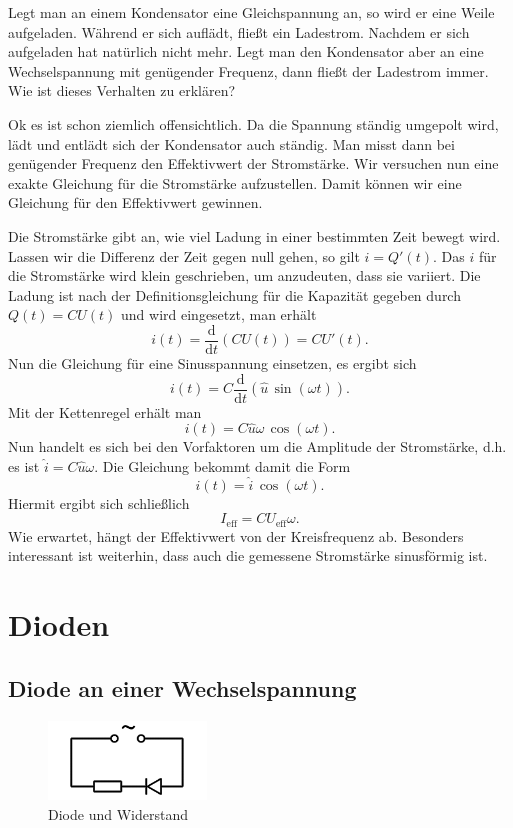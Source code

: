 \documentclass[a4paper,10pt,fleqn,twocolumn,twoside,dvipdfmx]{scrartcl}
\numberwithin{equation}{section}
\begin{document}
Legt man an einem Kondensator eine Gleichspannung an, so wird er eine
Weile aufgeladen. Während er sich auflädt, fließt ein Ladestrom.
Nachdem er sich aufgeladen hat natürlich nicht mehr. Legt man den
Kondensator aber an eine Wechselspannung mit genügender Frequenz,
dann fließt der Ladestrom immer. Wie ist dieses Verhalten zu
erklären?

Ok es ist schon ziemlich offensichtlich. Da die Spannung ständig
umgepolt wird, lädt und entlädt sich der Kondensator auch ständig.
Man misst dann bei genügender Frequenz den Effektivwert
der Stromstärke. Wir versuchen nun eine exakte Gleichung für die
Stromstärke aufzustellen. Damit können wir eine Gleichung
für den Effektivwert gewinnen.

Die Stromstärke gibt an, wie viel Ladung in einer bestimmten Zeit
bewegt wird. Lassen wir die Differenz der Zeit gegen null gehen,
so gilt $i=Q'(t)$. Das $i$ für die Stromstärke wird klein
geschrieben, um anzudeuten, dass sie variiert. Die Ladung ist nach
der Definitionsgleichung für die Kapazität gegeben durch
$Q(t)=CU(t)$ und wird eingesetzt, man erhält%
\begin{equation}
i(t) = \frac{\mathrm d}{\mathrm dt}(CU(t)) = CU'(t).
\end{equation}
Nun die Gleichung für eine Sinusspannung einsetzen, es ergibt sich%
\begin{equation}
i(t) = C\frac{\mathrm d}{\mathrm dt}
(\hat u\,\sin(\omega t)).
\end{equation}
Mit der Kettenregel erhält man
\begin{equation}
i(t) = C\hat u \omega\,\cos(\omega t).
\end{equation}
Nun handelt es sich bei den Vorfaktoren um die
Amplitude der Stromstärke, d.h. es ist
$\hat i=C\hat u\omega$. Die Gleichung bekommt damit
die Form%
\begin{equation}
i(t) = \hat i\,\cos(\omega t).
\end{equation}
Hiermit ergibt sich schließlich
\begin{equation}
I_{\mathrm{eff}} = CU_{\mathrm{eff}}\omega.
\end{equation}
Wie erwartet, hängt der Effektivwert von der Kreisfrequenz
ab. Besonders interessant ist weiterhin, dass auch die gemessene
Stromstärke sinusförmig ist.

\section{Dioden}
\subsection{Diode an einer Wechselspannung}
\begin{figure}[h]
\centering
\includegraphics[width=42mm]{img/DiodeR.png}
\caption{Diode und Widerstand}
\label{DiodeR}
\end{figure}
\end{document}
